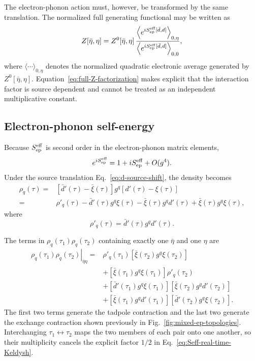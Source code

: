 \documentclass[
 reprint,
 superscriptaddress,
 amsmath,amssymb,
 aps,prb,
 longbibliography,
 floatfix
]{revtex4-2}
\begin{document}
The electron-phonon action must, however, be transformed by the same translation. The normalized full generating functional may be written as
\begin{equation}
Z[\bar\eta,\eta]
=
Z^0[\bar\eta,\eta]\,
\frac{
\left\langle
e^{iS_{\rm ep}^{\rm eff}[\bar d,d]}
\right\rangle_{0,\eta}
}{
\left\langle
e^{iS_{\rm ep}^{\rm eff}[\bar d,d]}
\right\rangle_{0,0}
},
\label{eq:full-Z-factorization}
\end{equation}
where \(\langle\cdots\rangle_{0,\eta}\) denotes the normalized quadratic electronic average generated by \(Z^0[\bar\eta,\eta]\). Equation~\eqref{eq:full-Z-factorization} makes explicit that the interaction factor is source dependent and cannot be treated as an independent multiplicative constant.

\subsection{Electron-phonon self-energy}
\label{subsec:pf-ep-self-energy}

Because \(S_{\rm ep}^{\rm eff}\) is second order in the electron-phonon matrix elements,
\begin{equation*}
e^{iS_{\rm ep}^{\rm eff}}
=
1+iS_{\rm ep}^{\rm eff}+O(g^4).
\end{equation*}
Under the source translation Eq.~\eqref{eq:d-source-shift}, the density becomes
\begin{align*}
\rho_q(\tau)
={}&
[\bar d'(\tau)-\bar\xi(\tau)]
g^q
[d'(\tau)-\xi(\tau)]
\\
={}&
\rho'_q(\tau)
-\bar d'(\tau)g^q\xi(\tau)
-\bar\xi(\tau)g^qd'(\tau)
+\bar\xi(\tau)g^q\xi(\tau),
\end{align*}
where
\begin{equation*}
\rho'_q(\tau)
=
\bar d'(\tau)g^qd'(\tau).
\end{equation*}

The terms in \(\rho_q(\tau_1)\rho_q(\tau_2)\) containing exactly one \(\bar\eta\) and one \(\eta\) are
\begin{align*}
\left.
\rho_q(\tau_1)\rho_q(\tau_2)
\right|_{\bar\eta\eta}
={}&
\rho'_q(\tau_1)
\left[
\bar\xi(\tau_2)g^q\xi(\tau_2)
\right]
\\
&+
\left[
\bar\xi(\tau_1)g^q\xi(\tau_1)
\right]
\rho'_q(\tau_2)
\\
&+
\left[
\bar d'(\tau_1)g^q\xi(\tau_1)
\right]
\left[
\bar\xi(\tau_2)g^qd'(\tau_2)
\right]
\\
&+
\left[
\bar\xi(\tau_1)g^qd'(\tau_1)
\right]
\left[
\bar d'(\tau_2)g^q\xi(\tau_2)
\right].
\end{align*}
The first two terms generate the tadpole contraction and the last two generate the exchange contraction shown previously in Fig.~\ref{fig:mixed-ep-topologies}. Interchanging \(\tau_1\leftrightarrow\tau_2\) maps the two members of each pair onto one another, so their multiplicity cancels the explicit factor \(1/2\) in Eq.~\eqref{eq:Seff-real-time-Keldysh}.
\end{document}
